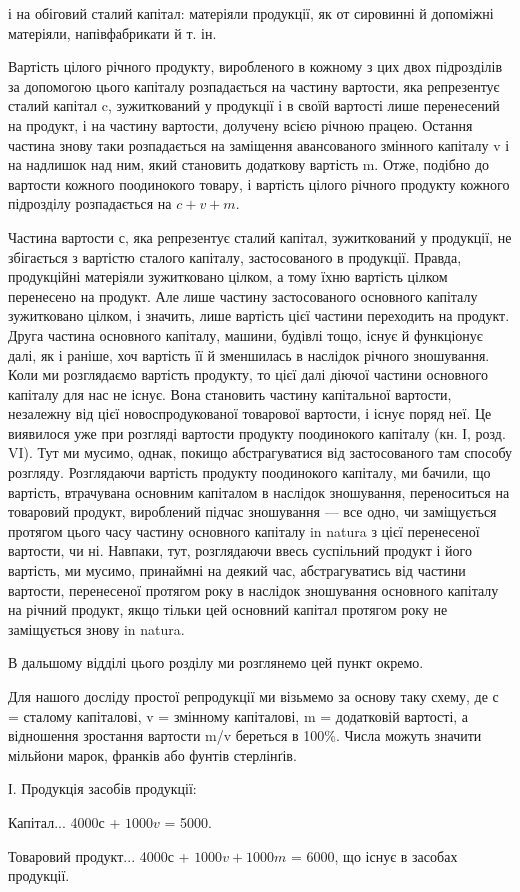 \parcont{}  %
і на обіговий сталий капітал: матеріяли продукції, як от сировинні й допоміжні
матеріяли, напівфабрикати й т. ін.

Вартість цілого річного продукту, виробленого в кожному з цих
двох підрозділів за допомогою цього капіталу розпадається на частину
вартости, яка репрезентує сталий капітал c, зужиткований у продукції і в
своїй вартості лише перенесений на продукт, і на частину вартости, долучену
всією річною працею. Остання частина знову таки розпадається
на заміщення авансованого змінного капіталу v і на надлишок над ним,
який становить додаткову вартість m. Отже, подібно до вартости кожного
поодинокого товару, і вартість цілого річного продукту кожного
підрозділу розпадається на $c + v + m$.

Частина вартости с, яка репрезентує сталий капітал, зужиткований
у продукції, не збігається з вартістю сталого капіталу, застосованого
в продукції. Правда, продукційні матеріяли зужитковано цілком, а тому
їхню вартість цілком перенесено на продукт. Але лише частину застосованого
основного капіталу зужитковано цілком, і значить, лише вартість
цієї частини переходить на продукт. Друга частина основного капіталу,
машини, будівлі тощо, існує й функціонує далі, як і раніше, хоч
вартість її й зменшилась в наслідок річного зношування. Коли ми розглядаємо
вартість продукту, то цієї далі діючої частини основного капіталу
для нас не існує. Вона становить частину капітальної вартости, незалежну
від цієї новоспродукованої товарової вартости, і існує поряд неї. Це
виявилося уже при розгляді вартости продукту поодинокого капіталу
(кн. І, розд. VI). Тут ми мусимо, однак, покищо абстрагуватися від застосованого
там способу розгляду. Розглядаючи вартість продукту поодинокого
капіталу, ми бачили, що вартість, втрачувана основним капіталом
в наслідок зношування, переноситься на товаровий продукт,
вироблений підчас зношування — все одно, чи заміщується протягом цього
часу частину основного капіталу in natura з цієї перенесеної вартости,
чи ні. Навпаки, тут, розглядаючи ввесь суспільний продукт і його вартість,
ми мусимо, принаймні на деякий час, абстрагуватись від частини
вартости, перенесеної протягом року в наслідок зношування основного
капіталу на річний продукт, якщо тільки цей основний капітал протягом
року не заміщується знову in natura.

В дальшому відділі цього розділу ми розглянемо цей пункт окремо.

Для нашого досліду простої репродукції ми візьмемо за основу таку схему,
де с = сталому капіталові, v = змінному капіталові, m = додатковій
вартості, а відношення зростання вартости m/v береться в 100\%. Числа
можуть значити мільйони марок, франків або фунтів стерлінґів.

І. Продукція засобів продукції:

Капітал... 4000с + $1000v$ = 5000.

Товаровий продукт... 4000с + $1000v + 1000m$ = 6000, що існує
в засобах продукції.
\parbreak{}  %
